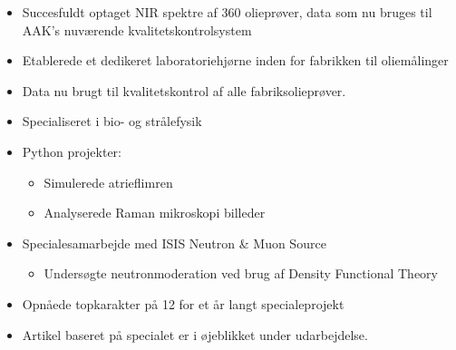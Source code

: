 \documentclass[10pt,a4paper,ragged2e,withhyper]{altacv}
\begin{document}
\begin{paracol}{2}
\divider


\divider


\divider\end{paracol}

\begin{multicols}{2}  %
\begin{itemize}
    \item Succesfuldt optaget NIR spektre af 360 olieprøver, data som nu bruges til AAK's nuværende kvalitetskontrolsystem
    \item Etablerede et dedikeret laboratoriehjørne inden for fabrikken til oliemålinger
    \item Data nu brugt til kvalitetskontrol af alle fabriksolieprøver.
\end{itemize}
\end{multicols}
\divider

\begin{multicols}{2}  %
\begin{itemize}
    \item Specialiseret i bio- og strålefysik
    \item Python projekter:
        \begin{itemize}
            \item Simulerede atrieflimren
            \item Analyserede Raman mikroskopi billeder
        \end{itemize}
    \item Specialesamarbejde med ISIS Neutron \& Muon Source
        \begin{itemize}
            \item Undersøgte neutronmoderation ved brug af Density Functional Theory
        \end{itemize}
    \item Opnåede topkarakter på 12 for et år langt specialeprojekt
    \item Artikel baseret på specialet er i øjeblikket under udarbejdelse.
\end{itemize}
\end{multicols}
\divider
\end{document}
